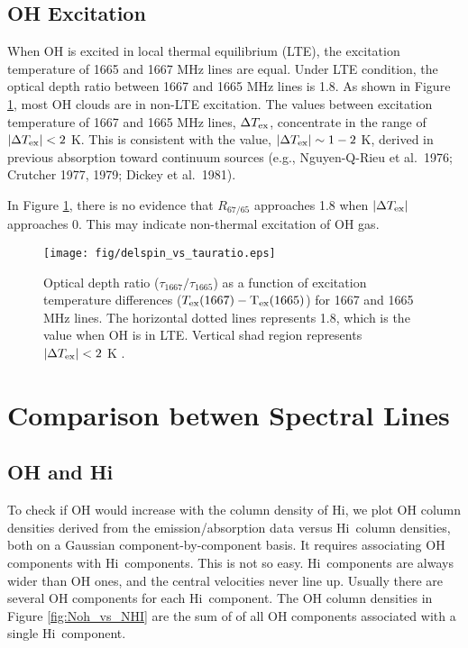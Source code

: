 \documentclass[preprint]{emulateapj}
\def\hi{H{\sc i}}
\begin{document}
\subsection{OH Excitation}
\label{subsec:oh_excitation}

When OH is excited in  local  thermal equilibrium (LTE), the excitation temperature of 1665 and 1667 MHz lines are equal. Under LTE condition, the optical depth ratio between 1667 and 1665 MHz lines is 1.8.  As shown in Figure \ref{fig:delspin_vs_tauratio}, most OH clouds are in non-LTE excitation. The values between excitation temperature of 1667 and 1665 MHz lines, $\Delta T\rm_{ex}$, concentrate in the range of  $|\Delta T\rm_{ex}| < 2$ K.  This is consistent with the value, $|\Delta T\rm_{ex}| \sim 1-2 $ K, derived in previous absorption toward continuum sources (e.g., Nguyen-Q-Rieu et al.\ 1976; Crutcher 1977, 1979; Dickey et al.\ 1981).

In Figure \ref{fig:delspin_vs_tauratio}, there is no evidence that $R_{67/65}$  approaches 1.8 when $|\Delta T\rm_{ex}|$ approaches 0. This may indicate non-thermal excitation of OH gas. 

\begin{figure}
\texttt{[image: fig/delspin\_vs\_tauratio.eps]}
\caption{Optical depth ratio ($\tau_{1667}/\tau_{1665}$) as a function of  excitation temperature differences ($T\rm_{ex}(1667)-T_{ex}(1665)$) for 1667 and 1665 MHz lines. The horizontal dotted lines represents 1.8, which is the value when OH is in LTE. Vertical shad region represents  $|\Delta T\rm_{ex}| < 2$ K .}
\label{fig:delspin_vs_tauratio} 
\end{figure}

\section{Comparison betwen Spectral Lines}
\label{sec:comparison}
\subsection{OH and \hi\ }
\label{subsec:hioh}
To check if OH would increase with the column density of \hi, we plot OH column densities derived from the emission/absorption data versus \hi\ column densities, both on a Gaussian component-by-component basis. It requires associating OH components with \hi\ components. This is not so easy. \hi\ components are always wider than OH ones, and the central velocities never line up. Usually there are several OH components for each \hi\ component. The OH column densities in Figure \ref{fig:Noh_vs_NHI} are the sum of of all OH components associated with a single \hi\ component. 
\end{document}
